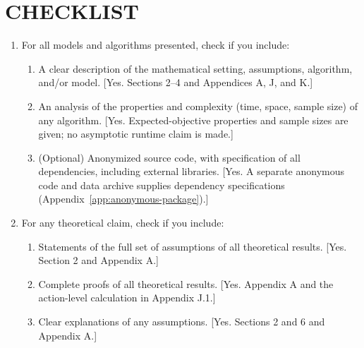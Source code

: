 \section*{CHECKLIST}
\begin{enumerate}

  \item For all models and algorithms presented, check if you include:
  \begin{enumerate}
    \item A clear description of the mathematical setting, assumptions, algorithm, and/or model. [Yes. Sections 2--4 and Appendices A, J, and K.]
    \item An analysis of the properties and complexity (time, space, sample size) of any algorithm. [Yes. Expected-objective properties and sample sizes are given; no asymptotic runtime claim is made.]
    \item (Optional) Anonymized source code, with specification of all dependencies, including external libraries. [Yes. A separate anonymous code and data archive supplies dependency specifications (Appendix~\ref{app:anonymous-package}).]
  \end{enumerate}

  \item For any theoretical claim, check if you include:
  \begin{enumerate}
    \item Statements of the full set of assumptions of all theoretical results. [Yes. Section 2 and Appendix A.]
    \item Complete proofs of all theoretical results. [Yes. Appendix A and the action-level calculation in Appendix J.1.]
    \item Clear explanations of any assumptions. [Yes. Sections 2 and 6 and Appendix A.]     
  \end{enumerate}


\end{enumerate}
